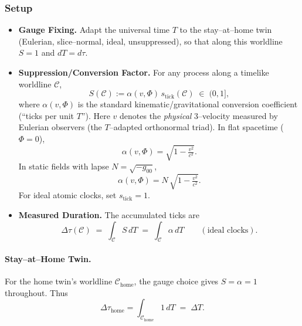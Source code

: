\documentclass[12pt]{article}
\theoremstyle{plain}
\begin{document}
\subsubsection*{Setup}
\begin{itemize}
    \item \textbf{Gauge Fixing.} Adapt the universal time $T$ to the stay–at–home twin (Eulerian, slice–normal, ideal, unsuppressed),
    so that along this worldline $S=1$ and $dT=d\tau$.

    \item \textbf{Suppression/Conversion Factor.} For any process along a timelike worldline $\mathcal{C}$,
    \begin{equation}
      S(\mathcal{C}) := \alpha(v,\Phi)\, s_{\text{tick}}(\mathcal{C}) \;\in\; (0,1],
      \label{eq:SuppressionFactorTwin}
    \end{equation}
    where $\alpha(v,\Phi)$ is the standard kinematic/gravitational conversion coefficient (“ticks per unit $T$”).
    Here \(v\) denotes the \emph{physical} 3–velocity measured by Eulerian observers (the $T$–adapted orthonormal triad).
    In flat spacetime ($\Phi=0$),
    \begin{equation}
    \alpha(v,\Phi)=\sqrt{1-\tfrac{v^2}{c^2}}.
    \label{eq:AlphaFlat}
    \end{equation}
    In static fields with lapse $N=\sqrt{-g_{00}}$,
    \begin{equation}
    \alpha(v,\Phi)=N\,\sqrt{1-\tfrac{v^2}{c^2}}.
    \label{eq:AlphaStatic}
    \end{equation}
    For ideal atomic clocks, set $s_{\text{tick}}=1$.

    \item \textbf{Measured Duration.} The accumulated ticks are
    \begin{equation}
      \Delta\tau(\mathcal{C}) \;=\; \int_{\mathcal{C}} S\,dT \;=\; \int_{\mathcal{C}} \alpha\, dT
      \qquad (\text{ideal clocks}).
      \label{eq:DurationTwin}
    \end{equation}
\end{itemize}

\paragraph{Stay–at–Home Twin.}
For the home twin’s worldline $\mathcal{C}_{\text{home}}$, the gauge choice gives $S=\alpha=1$ throughout. Thus
\begin{equation}
\Delta\tau_{\text{home}}=\int_{\mathcal{C}_{\text{home}}} 1\, dT \;=\; \Delta T .
\label{eq:HomeTwin}
\end{equation}
\end{document}
